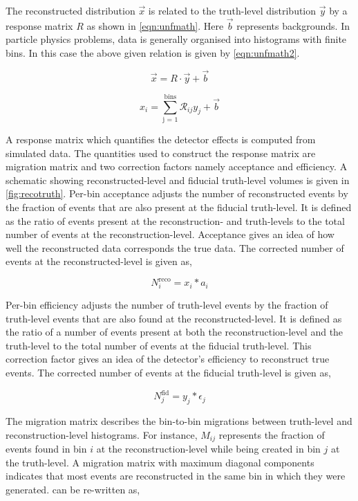 The reconstructed distribution $\vec{x}$ is related to the truth-level distribution $\vec{y}$ by
a response matrix $R$ as shown in \cref{eqn:unfmath}. Here $\vec{b}$ represents backgrounds. In particle physics problems, data is 
generally organised into histograms with finite bins. In this case the above given relation 
is given by \cref{eqn:unfmath2}.


\begin{equation}
    \vec{x} = R \cdot \vec{y} + \vec{b}
    \label{eqn:unfmath}
\end{equation}

\begin{equation}
    x_i = \sum_{\text{j = 1}}^{\text{bins}} \mathcal{R}_{ij} y_j + \vec{b}
    \label{eqn:unfmath2}
\end{equation}

A response matrix which quantifies the detector effects is computed from simulated data. 
The quantities used to construct the response matrix are migration matrix and two correction 
factors namely acceptance and efficiency. A schematic showing reconstructed-level
and fiducial truth-level volumes is given in \cref{fig:recotruth}.
Per-bin acceptance adjusts the number of reconstructed
events by the fraction of events that are also present at the fiducial truth-level. It is defined 
as the ratio of events present at the reconstruction- and truth-levels to the total number of 
events at the reconstruction-level. Acceptance gives an idea of how well the reconstructed data
corresponds the true data. The corrected number of events at the reconstructed-level is
given as,

\begin{equation}
    N_{i}^{\text{reco}} = x_i * a_i
\end{equation}

Per-bin efficiency adjusts the number of truth-level events by the fraction of truth-level events
that are also found at the reconstructed-level. It is defined as the ratio of a number of events
present at both the reconstruction-level and the truth-level to the total number of events at the 
fiducial truth-level. This correction factor gives an idea of the detector's efficiency to 
reconstruct true events. The corrected number of events at the fiducial truth-level is
given as,

\begin{equation}
    N_{j}^{\text{fid}} = y_j * \epsilon_j
\end{equation}

The migration matrix describes the bin-to-bin migrations between truth-level and 
reconstruction-level histograms. For instance, $M_{ij}$ represents the fraction of events 
found in bin $i$ at the reconstruction-level while being created in bin $j$ at the truth-level.
A migration matrix with maximum diagonal components indicates that most events are 
reconstructed in the same bin in which they were generated.  can be re-written as,

